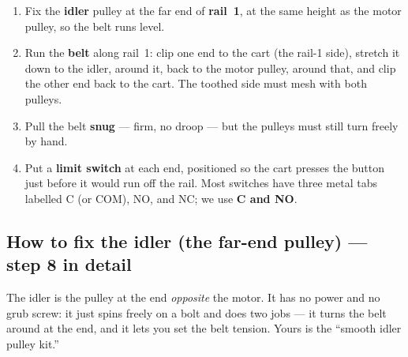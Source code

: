 \documentclass[11pt,a4paper]{article}
\begin{document}
\begin{enumerate}[leftmargin=*,itemsep=3pt,start=8]
  \item Fix the \textbf{idler} pulley at the far end of \textbf{rail~1}, at the same height as the motor
  pulley, so the belt runs level.
  \item Run the \textbf{belt} along rail~1: clip one end to the cart (the rail-1 side), stretch it down to
  the idler, around it, back to the motor pulley, around that, and clip the other end back to the cart.
  The toothed side must mesh with both pulleys.
  \item Pull the belt \textbf{snug} --- firm, no droop --- but the pulleys must still turn freely by hand.
  \item Put a \textbf{limit switch} at each end, positioned so the cart presses the button just before it
  would run off the rail. Most switches have three metal tabs labelled C (or COM), NO, and NC; we use
  \textbf{C and NO}.
\end{enumerate}

\subsection*{How to fix the idler (the far-end pulley) --- step 8 in detail}

The idler is the pulley at the end \emph{opposite} the motor. It has no power and no grub screw: it just
spins freely on a bolt and does two jobs --- it turns the belt around at the end, and it lets you set the
belt tension. Yours is the ``smooth idler pulley kit.''
\end{document}
